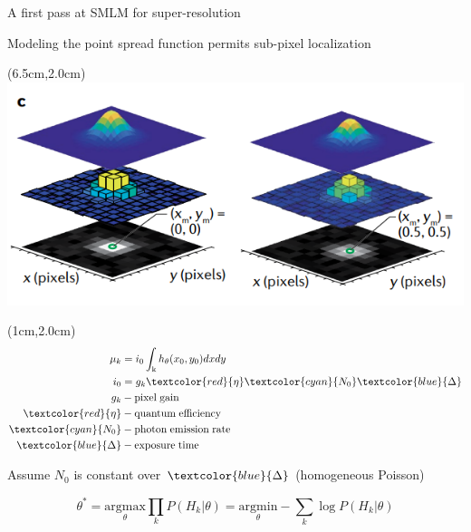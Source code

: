 \documentclass{beamer}					%
\begin{document}
\begin{frame}{A first pass at SMLM for super-resolution}

Modeling the point spread function permits sub-pixel localization 

\begin{textblock*}{8cm}(6.5cm,2.0cm)
\includegraphics[width=\textwidth]{Model.png}
\end{textblock*}

\begin{textblock*}{2cm}(1cm,2.0cm)
\begin{align*}
\mu_{k} &= i_{0}\int_{\mathrm{k}}h_{\theta}(x_{0},y_{0})dxdy\\
i_{0} &= g_{k}\textcolor{red}{\eta} \textcolor{cyan}{N_{0}}\textcolor{blue}{\Delta} 
\\
g_{k} &- \mathrm{pixel\; gain}\\
\textcolor{red}{\eta} &- \mathrm{quantum\; efficiency}\\
\textcolor{cyan}{N_{0}} &- \mathrm{photon\; emission\; rate}\\
\textcolor{blue}{\Delta} &- \mathrm{exposure\; time}
\end{align*}
\end{textblock*}

\vspace{2in}

Assume $N_{0}$ is constant over $\textcolor{blue}{\Delta}$ (homogeneous Poisson)

\begin{equation*}
\theta^{*} = \underset{\theta}{\mathrm{argmax}}\prod_{k}P(H_{k}|\theta)= \underset{\theta}{\mathrm{argmin}}-\sum_{k}\log P(H_{k}|\theta)
\end{equation*}

\end{frame}
\end{document}
